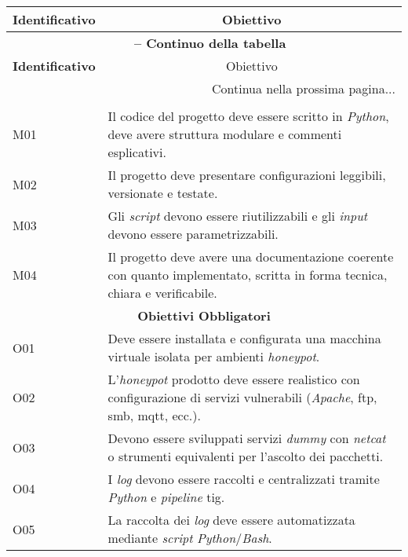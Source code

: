 \begin{center}
\begin{longtable}{|p{}|p{}|}
\hline
\multicolumn{1}{|c|}{\textbf{Identificativo}} & \multicolumn{1}{c|}{\textbf{Obiettivo}}\\ 
\hline 
\endfirsthead
\multicolumn{2}{c}{{\bfseries \tablename\ \thetable{} -- Continuo della tabella}}\\
\hline
\multicolumn{1}{|c|}{\textbf{Identificativo}} & \multicolumn{1}{c|}{Obiettivo}\\ \hline 
\endhead
\hline
\multicolumn{2}{|r|}{{Continua nella prossima pagina...}}\\
\hline
\endfoot
\endlastfoot 

\multicolumn{2}{|c|}{\textbf{Obiettivi Minimi}} \\ \hline
M01 & Il codice del progetto deve essere scritto in \textit{Python}, deve avere struttura modulare e commenti esplicativi. \\ \hline
M02 & Il progetto deve presentare configurazioni leggibili, versionate e testate. \\ \hline
M03 & Gli \textit{script} devono essere riutilizzabili e gli \textit{input} devono essere parametrizzabili. \\ \hline
M04 & Il progetto deve avere una documentazione coerente con quanto implementato, scritta in forma tecnica, chiara e verificabile. \\ \hline

\multicolumn{2}{|c|}{\textbf{Obiettivi Obbligatori}} \\ \hline
O01 & Deve essere installata e configurata una macchina virtuale isolata per ambienti \textit{honeypot}. \\ \hline
O02 & L'\textit{honeypot} prodotto deve essere realistico con configurazione di servizi vulnerabili (\textit{Apache}, \gls{ftp}, \gls{smb}, \gls{mqtt}, ecc.). \\ \hline
O03 & Devono essere sviluppati servizi \textit{dummy} con \textit{netcat} o strumenti equivalenti per l’ascolto dei pacchetti. \\ \hline
O04 & I \textit{log} devono essere raccolti e centralizzati tramite \textit{Python} e \textit{pipeline} \gls{tig}. \\ \hline
O05 & La raccolta dei \textit{log} deve essere automatizzata mediante \textit{script} \textit{Python}/\textit{Bash}. \\ \hline


\end{longtable}
\end{center}
